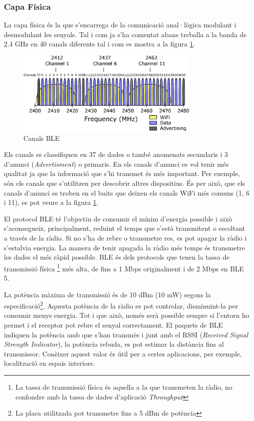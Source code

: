 \subsubsection{Capa Física}
La capa física és la que s'encarrega de la comunicació anal·lògica modulant i desmodulant les senyals.
Tal i com ja s'ha comentat abans treballa a la banda de 2.4 GHz en 40 canals diferents tal i com es mostra a la figura \ref{BLE_Channels}.

\begin{figure}[hb]
	\begin{center}
		\includegraphics[width=0.8\textwidth]{./diagrames/BLE_WiFi}
		\caption{Canals BLE}
		\label{BLE_Channels}
	\end{center}
\end{figure}

Els canals es classifiquen en 37 de dades o també anomenats secundaris i 3 d'anunci (\textit{Advertisment}) o primaris.
En els canals d'anunci es vol tenir més qualitat ja que la informació que s'hi transmet és més important.
Per exemple, són els canals que s'utilitzen per descobrir altres dispositius.
És per això, que els canals d'anunci es troben en el buits que deixen els canals WiFi més comuns (1, 6 i 11), es pot veure a la figura \ref{BLE_Channels}.

El protocol BLE té l'objectiu de consumir el mínim d'energia possible i això s'aconsegueix, principalment, reduint el temps que s'està transmitent o escoltant a través de la ràdio.
Si no s'ha de rebre o transmetre res, es pot apagar la ràdio i s'estalvia energia.
La manera de tenir apagada la ràdio més temps és transmetre les dades el més ràpid possible.
BLE és dels protocols que tenen la tassa de transmissió física \footnote{La tassa de transmissió física és aquella a la que transmeten la ràdio, no confondre amb la tassa de dades d'aplicació \textit{Throughput}} més alta, de fins a 1 Mbps originalment i de 2 Mbps en BLE 5.

La potència màxima de transmissió és de 10 dBm (10 mW) segons la especificació\footnote{La placa utilitzada pot transmetre fins a 5 dBm de potència}.
Aquesta potència de la ràdio es pot controlar, disminuint-la per consumir menys energia.
Tot i que això, només serà possible sempre si l'entorn ho permet i el receptor pot rebre el senyal correctament.
El paquets de BLE indiquen la potència amb que s'han transmès i junt amb el RSSI (\textit{Received Signal Strength Indicator}), la potència rebuda, es pot estimar la distància fins al transmissor.
Conèixer aquest valor és útil per a certes aplicacions, per exemple, localització en espais interiors.

